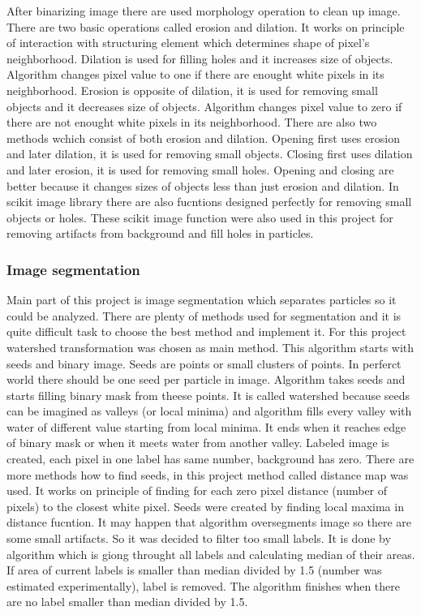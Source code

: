 After binarizing image there are used morphology operation to clean up image.
There are two basic operations called erosion and dilation. It works on principle
of interaction with structuring element which determines shape of pixel's neighborhood.
Dilation is used for filling holes and it increases size of objects. Algorithm changes pixel
value to one if there are enought white pixels in its neighborhood. Erosion is opposite
of dilation, it is used for removing small objects and it decreases size of objects.
Algorithm changes pixel value to zero if there are not enought white pixels in its
neighborhood. There are also two methods wchich consist of both erosion and dilation.
Opening first uses erosion and later dilation, it is used for removing small objects.
Closing first uses dilation and later erosion, it is used for removing small holes.
Opening and closing are better because it changes sizes of objects less than just erosion
and dilation. In scikit image library there are also fucntions designed perfectly
for removing small objects or holes. These scikit image function were also used
in this project for removing artifacts from background and fill holes in particles.

\subsubsection{Image segmentation}\label{segmentation}

Main part of this project is image segmentation which separates particles so it could
be analyzed. There are plenty of methods used for segmentation and it is quite difficult
task to choose the best method and implement it. For this project watershed transformation
was chosen as main method. This algorithm starts with seeds and binary image. Seeds are
points or small clusters of points. In perferct world there should be one seed per
particle in image. Algorithm takes seeds and starts filling binary mask from theese points.
It is called watershed because seeds can be imagined as valleys (or local minima) and
algorithm fills every valley with water of different value starting from local minima.
It ends when it reaches edge of binary mask or when it meets water from another valley.
Labeled image is created, each pixel in one label has same number, background has zero.
There are more methods how to find seeds, in this project method called distance map
was used. It works on principle of finding for each zero pixel distance (number of pixels)
to the closest white pixel. Seeds were created by finding local maxima in distance fucntion.
It may happen that algorithm oversegments image so there are some small artifacts. So it
was decided to filter too small labels. It is done by algorithm which is giong throught
all labels and calculating median of their areas. If area of current labels is smaller
than median divided by 1.5 (number was estimated experimentally), label is removed.
The algorithm finishes when there are no label smaller than median divided by 1.5. \cite{2, roerdink2000watershed, skimage}

